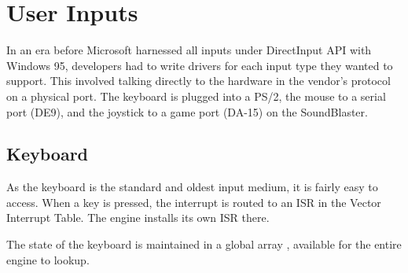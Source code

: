 \section{User Inputs}
In an era before Microsoft harnessed all inputs under DirectInput API with Windows 95, developers had to write drivers for each input type they wanted to support. This involved talking directly to the hardware in the vendor's protocol on a physical port. The keyboard is plugged into a PS/2, the mouse to a serial port (DE9), and the joystick to a game port (DA-15) on the SoundBlaster.





\subsection{Keyboard}

As the keyboard is the standard and oldest input medium, it is fairly easy to access. When a key is pressed, the interrupt is routed to an ISR in the Vector Interrupt Table. The engine installs its own ISR there.\\


\par
\begin{minipage}{\textwidth}

\end{minipage}

The state of the keyboard is maintained in a global array , available for the entire engine to lookup.\\
\par

\begin{minipage}{\textwidth}

\end{minipage}



